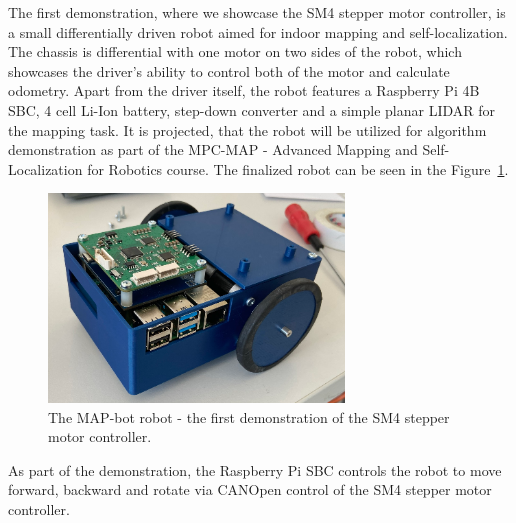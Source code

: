 The first demonstration, where we showcase the SM4 stepper motor controller, is a small differentially driven robot aimed for indoor mapping and self-localization.
The chassis is differential with one motor on two sides of the robot, which showcases the driver's ability to control both of the motor and calculate odometry.
Apart from the driver itself, the robot features a Raspberry Pi 4B SBC, 4 cell Li-Ion battery, step-down converter and a simple planar LIDAR for the mapping task.
It is projected, that the robot will be utilized for algorithm demonstration as part of the MPC-MAP - Advanced Mapping and Self-Localization for Robotics course.
The finalized robot can be seen in the Figure~\ref{fig:map_bot}.

\begin{figure}[H]
    \centering
    \includegraphics[width=0.7\textwidth]{obrazky/map_bot}
    \caption{The MAP-bot robot - the first demonstration of the SM4 stepper motor controller.}
    \label{fig:map_bot}
\end{figure}

As part of the demonstration, the Raspberry Pi SBC controls the robot to move forward, backward and rotate via CANOpen control of the SM4 stepper motor controller.
